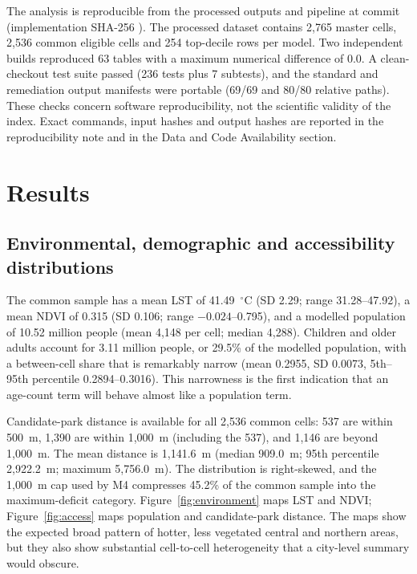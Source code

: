 \documentclass[times,twoside]{_Templates/MultiTargetManuscript}
\begin{document}
The analysis is reproducible from the processed outputs and pipeline at commit
\texttt{} (implementation
SHA-256
\texttt{}).
The processed dataset contains 2,765 master cells, 2,536 common eligible cells
and 254 top-decile rows per model. Two independent builds reproduced 63 tables
with a maximum numerical difference of 0.0. A clean-checkout test suite passed
(236 tests plus 7 subtests), and the standard and remediation output manifests
were portable (69/69 and 80/80 relative paths). These checks concern software
reproducibility, not the scientific validity of the index. Exact commands,
input hashes and output hashes are reported in the reproducibility note and in
the Data and Code Availability section.

\section{Results}

\subsection{Environmental, demographic and accessibility distributions}

The common sample has a mean LST of 41.49~$^\circ$C (SD 2.29; range
31.28--47.92), a mean NDVI of 0.315 (SD 0.106; range $-0.024$--0.795), and a
modelled population of 10.52 million people (mean 4,148 per cell; median 4,288).
Children and older adults account for 3.11 million people, or 29.5\% of the
modelled population, with a between-cell share that is remarkably narrow
(mean 0.2955, SD 0.0073, 5th--95th percentile 0.2894--0.3016). This narrowness
is the first indication that an age-count term will behave almost like a
population term.

Candidate-park distance is available for all 2,536 common cells: 537 are within
500~m, 1,390 are within 1,000~m (including the 537), and 1,146 are beyond
1,000~m. The mean distance is
1,141.6~m (median 909.0~m; 95th percentile 2,922.2~m; maximum 5,756.0~m).
The distribution is right-skewed, and the 1,000~m cap used by M4 compresses 45.2\%
of the common sample into the maximum-deficit category. Figure~\ref{fig:environment}
maps LST and NDVI; Figure~\ref{fig:access} maps population and candidate-park
distance. The maps show the expected broad pattern of hotter, less vegetated
central and northern areas, but they also show substantial cell-to-cell
heterogeneity that a city-level summary would obscure.
\end{document}

